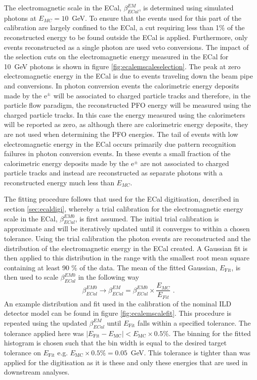 The electromagnetic scale in the ECal, $\beta^{EM}_{ECal}$, is determined using simulated photons at $E_{MC} = 10$~GeV.  To ensure that the events used for this part of the calibration are largely confined to the ECal, a cut requiring less than 1\% of the reconstructed energy to be found outside the ECal is applied.  Furthermore, only events reconstructed as a single photon are used veto conversions.  The impact of the selection cuts on the electromagnetic energy measured in the ECal for 10~GeV photons is shown in figure \ref{fig:ecalemscaleselection}.  The peak at zero electromagnetic energy in the ECal is due to events traveling down the beam pipe and conversions.  In photon conversion events the calorimetric energy deposits made by the $\text{e}^{\pm}$ will be associated to charged particle tracks and therefore, in the particle flow paradigm, the reconstructed PFO energy will be measured using the charged particle tracks.  In this case the energy measured using the calorimeters will be reported as zero, as although there are calorimetric energy deposits, they are not used when determining the PFO energies.  The tail of events with low electromagnetic energy in the ECal occurs primarily due pattern recognition failures in photon conversion events.  In these events a small fraction of the calorimetric energy deposits made by the $\text{e}^{\pm}$ are not associated to charged particle tracks and instead are reconstructed as separate photons with a reconstructed energy much less than $E_{MC}$.

The fitting procedure follows that used for the ECal digitisation, described in section \ref{sec:ecaldigi}, whereby a trial calibration for the electromagnetic energy scale in the ECal, $\beta^{EM0}_{ECal}$, is first assumed.  The initial trial calibration is approximate and will be iteratively updated until it converges to within a chosen tolerance.  Using the trial calibration the photon events are reconstructed and the distribution of the electromagnetic energy in the ECal created.  A Gaussian fit is then applied to this distribution in the range with the smallest root mean square containing at least 90 \% of the data.  The mean of the fitted Gaussian, $E_{\text{Fit}}$, is then used to scale $\beta^{EM0}_{ECal}$ in the following way
%
\begin{equation}
\beta^{EM0}_{ECal} \rightarrow \beta^{EM}_{ECal} = \beta^{EM0}_{ECal} \times \frac{E_{MC}}{E_{Fit}}\text{ .}
\end{equation}
%
An example distribution and fit used in the calibration of the nominal ILD detector model can be found in figure \ref{fig:ecalemscalefit}.  This procedure is repeated using the updated $\beta^{EM}_{ECal}$ until $E_{\text{Fit}}$ falls within a specified tolerance.  The tolerance applied here was $|E_{\text{Fit}} - E_{\text{MC}}| < E_{\text{MC}} \times 0.5 \%$.  The binning for the fitted histogram is chosen such that the bin width is equal to the desired target tolerance on $E_{\text{Fit}}$ e.g. $E_{\text{MC}} \times 0.5 \% = 0.05$~GeV.  This tolerance is tighter than was applied for the digitisation as it is these and only these energies that are used in downstream analyses.   
 
